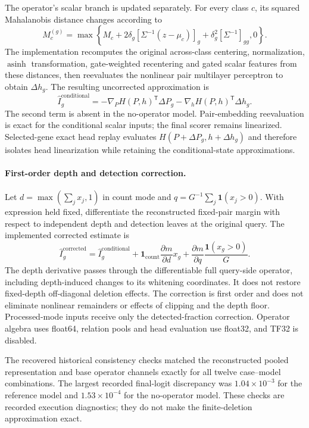 The operator's scalar branch is updated separately. For every class $c$, its squared Mahalanobis distance changes according to
\[
 M_c^{(g)}=\max\!\left\{M_c+
 2\delta_g[\Sigma^{-1}(z-\mu_c)]_g+
 \delta_g^2[\Sigma^{-1}]_{gg},0\right\}.
\]
The implementation recomputes the original across-class centering, normalization, $\operatorname{asinh}$ transformation, gate-weighted recentering and gated scalar features from these distances, then reevaluates the nonlinear pair multilayer perceptron to obtain $\Delta h_g$. The resulting uncorrected approximation is
\[
 \widehat I_g^{\mathrm{conditional}}
 =-\nabla_P H(P,h)^{\mathsf T}\Delta P_g
  -\nabla_h H(P,h)^{\mathsf T}\Delta h_g.
\]
The second term is absent in the no-operator model. Pair-embedding reevaluation is exact for the conditional scalar inputs; the final scorer remains linearized. Selected-gene exact head replay evaluates $H(P+\Delta P_g,h+\Delta h_g)$ and therefore isolates head linearization while retaining the conditional-state approximations.

\paragraph{First-order depth and detection correction.}
Let $d=\max(\sum_jx_j,1)$ in count mode and $q=G^{-1}\sum_j\mathbf1(x_j>0)$. With expression held fixed, differentiate the reconstructed fixed-pair margin with respect to independent depth and detection leaves at the original query. The implemented corrected estimate is
\[
 \widehat I_g^{\mathrm{corrected}}
 =\widehat I_g^{\mathrm{conditional}}
 +\mathbf1_{\mathrm{count}}\frac{\partial m}{\partial d}x_g
 +\frac{\partial m}{\partial q}\frac{\mathbf1(x_g>0)}{G}.
\]
The depth derivative passes through the differentiable full query-side operator, including depth-induced changes to its whitening coordinates. It does not restore fixed-depth off-diagonal deletion effects. The correction is first order and does not eliminate nonlinear remainders or effects of clipping and the depth floor. Processed-mode inputs receive only the detected-fraction correction. Operator algebra uses float64, relation pools and head evaluation use float32, and TF32 is disabled.

The recovered historical consistency checks matched the reconstructed pooled representation and base operator channels exactly for all twelve case--model combinations. The largest recorded final-logit discrepancy was $1.04\times10^{-3}$ for the reference model and $1.53\times10^{-4}$ for the no-operator model. These checks are recorded execution diagnostics; they do not make the finite-deletion approximation exact.

